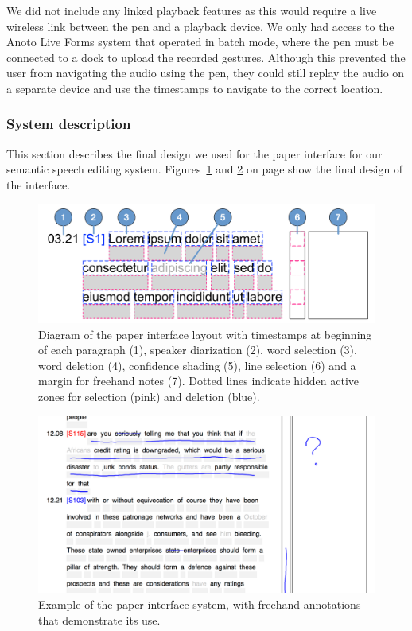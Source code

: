 We did not include any linked playback features as this would require a live wireless link between the pen and a
playback device. We only had access to the Anoto Live Forms system that operated in batch mode, where the pen must be
connected to a dock to upload the recorded gestures. Although this prevented the user from navigating the audio using
the pen, they could still replay the audio on a separate device and use the timestamps to navigate to the correct
location.

\subsubsection{System description}

This section describes the final design we used for the paper interface for our semantic speech editing system.
Figures~\ref{fig:paper-interface-diagram} and \ref{fig:paper-interface-example} on page
\pageref{fig:paper-interface-diagram} show the final design of the interface.

\begin{figure}[p]
  \centering
  \includegraphics[width=\columnwidth]{figs/paper-interface-diagram.pdf}
  \caption{Diagram of the paper interface layout with timestamps at beginning of each paragraph (1), speaker
    diarization (2), word selection (3), word deletion (4), confidence shading (5), line selection (6) and a margin for
  freehand notes (7). Dotted lines indicate hidden active zones for selection (pink) and deletion (blue).}
  \label{fig:paper-interface-diagram}
\end{figure}

\begin{figure}[p]
  \centering
  \includegraphics[width=\columnwidth]{figs/paper-interface-example-annotations.png}
  \caption{Example of the paper interface system, with freehand annotations that demonstrate its use.}
  \label{fig:paper-interface-example}
\end{figure}

